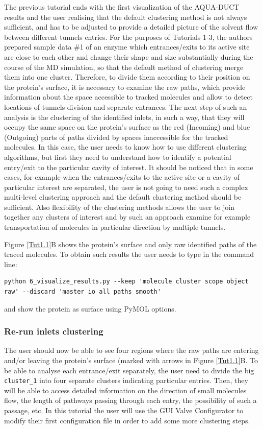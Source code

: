 \documentclass[9pt,tutorial]{livecoms}
\begin{document}
The previous tutorial ends with the first visualization of the AQUA-DUCT results and the user realising that the default clustering method is not always sufficient, and has to be adjusted to provide a detailed picture of the solvent flow between different tunnels entries. For the purposes of Tutorials 1-3, the authors prepared sample data \#1 of an enzyme which entrances/exits to its active site are close to each other and change their shape and size substantially during the course of the MD simulation, so that the default method of clustering merge them into one cluster. Therefore, to divide them according to their position on the protein's surface, it is necessary to examine the raw paths, which provide information about the space accessible to tracked molecules and allow to detect locations of tunnels division and separate entrances. The next step of such an analysis is the clustering of the identified inlets, in such a way, that they will occupy the same space on the protein's surface as the red (Incoming) and blue (Outgoing) parts of paths divided by spaces inaccessible for the tracked molecules. In this case, the user needs to know how to use different clustering algorithms, but first they need to understand how to identify a potential entry/exit to the particular cavity of interest. It should be noticed that in some cases, for example when the entrances/exits to the active site or a cavity of particular interest are separated, the user is not going to need such a complex multi-level clustering approach and the default clustering method should be sufficient. Also flexibility of the clustering methods allows the user to join together any clusters of interest and by such an approach examine for example transportation of molecules in particular direction by multiple tunnels.

Figure \ref{Tut1.1}B shows the protein's surface and only raw identified paths of the traced molecules. To obtain such results the user needs to type in the command line:
\begin{lstlisting}[columns=fullflexible]
python 6_visualize_results.py --keep 'molecule cluster scope object raw' --discard 'master io all paths smooth'
\end{lstlisting}
and show the protein as surface using PyMOL options.

\subsubsection{Re-run inlets clustering}
The user should now be able to see four regions where the raw paths are entering and/or leaving the protein's surface (marked with arrows in Figure \ref{Tut1.1}B. To be able to analyse each entrance/exit separately, the user need to divide the big \texttt{cluster\_1} into four separate clusters indicating particular entries. Then, they will be able to access detailed information on the direction of small molecules flow, the length of pathways passing through each entry, the possibility of such a passage, etc. In this tutorial the user will use the GUI Valve Configurator to modify their first configuration file in order to add some more clustering steps. 
\end{document}
